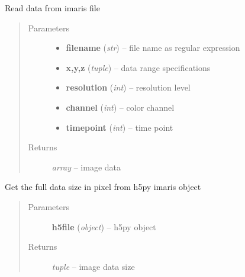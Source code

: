 \documentclass[letterpaper,10pt,english]{sphinxmanual}
\begin{document}

\begin{fulllineitems}
\label{api/ClearMap.IO:ClearMap.IO.Imaris.readData}
Read data from imaris file
\begin{quote}\begin{description}
\item[{Parameters}] \leavevmode\begin{itemize}
\item {} 
\textbf{filename} (\emph{str}) --
file name as regular expression

\item {} 
\textbf{x,y,z} (\emph{tuple}) --
data range specifications

\item {} 
\textbf{resolution} (\emph{int}) --
resolution level

\item {} 
\textbf{channel} (\emph{int}) --
color channel

\item {} 
\textbf{timepoint} (\emph{int}) --
time point

\end{itemize}

\item[{Returns}] \leavevmode
\emph{array} --
image data

\end{description}\end{quote}

\end{fulllineitems}


\begin{fulllineitems}
\label{api/ClearMap.IO:ClearMap.IO.Imaris.getDataSize}
Get the full data size in pixel from h5py imaris object
\begin{quote}\begin{description}
\item[{Parameters}] \leavevmode
\textbf{h5file} (\emph{object}) --
h5py object

\item[{Returns}] \leavevmode
\emph{tuple} --
image data size

\end{description}\end{quote}

\end{fulllineitems}
\end{document}
